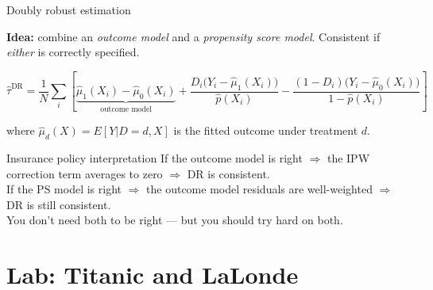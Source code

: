 \documentclass[aspectratio=169, 10pt]{beamer}
\begin{document}
\begin{frame}{Doubly robust estimation}

  \textbf{Idea:} combine an \emph{outcome model} and a \emph{propensity score model}. Consistent if \emph{either} is correctly specified.

  \[
    \widehat{\tau}^{\text{DR}} =
      \frac{1}{N}\sum_i \left[
        \underbrace{\hat{\mu}_1(X_i) - \hat{\mu}_0(X_i)}_{\text{outcome model}}
        + \frac{D_i\bigl(Y_i - \hat{\mu}_1(X_i)\bigr)}{\hat{p}(X_i)}
        - \frac{(1-D_i)\bigl(Y_i - \hat{\mu}_0(X_i)\bigr)}{1-\hat{p}(X_i)}
      \right]
  \]

  where $\hat{\mu}_d(X) = E[Y|D=d, X]$ is the fitted outcome under treatment $d$.

  \pause
  \begin{block}{Insurance policy interpretation}
    If the outcome model is right $\Rightarrow$ the IPW correction term averages to zero $\Rightarrow$ DR is consistent.\\
    If the PS model is right $\Rightarrow$ the outcome model residuals are well-weighted $\Rightarrow$ DR is still consistent.\\
    You don't need both to be right --- but you should try hard on both.
  \end{block}

\end{frame}

\section{Lab: Titanic and LaLonde}
\end{document}
